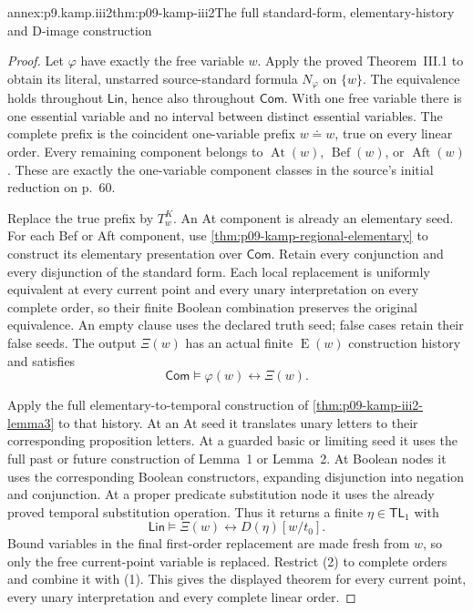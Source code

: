 \begin{annexitem}{annex:p9.kamp.iii2}{thm:p09-kamp-iii2}{The full standard-form, elementary-history and D-image construction}
\begin{proof}
Let \(\varphi\) have exactly the free variable \(w\).
Apply the proved Theorem~III.1 to obtain its literal, unstarred
source-standard formula \(N_\varphi\) on \(\{w\}\).
The equivalence holds throughout \(\mathsf{Lin}\), hence
also throughout \(\mathsf{Com}\). With one free variable
there is one essential variable and no interval between distinct
essential variables. The complete prefix is the coincident
one-variable prefix \(w\doteq w\), true on every linear
order. Every remaining component belongs to
\(\operatorname{At}(w)\), \(\operatorname{Bef}(w)\),
or \(\operatorname{Aft}(w)\). These are exactly the
one-variable component classes in the source's initial reduction
on p.~60.

Replace the true prefix by \(T^K_w\). An At component is
already an elementary seed. For each Bef or Aft component, use
\cref{thm:p09-kamp-regional-elementary} to construct its elementary
presentation over \(\mathsf{Com}\). Retain every conjunction
and every disjunction of the standard form. Each local replacement
is uniformly equivalent at every current point and every unary
interpretation on every complete order, so their finite Boolean
combination preserves the original equivalence. An empty clause
uses the declared truth seed; false cases retain their false
seeds. The output \(\Xi(w)\) has an actual finite
\(\operatorname{E}(w)\) construction history and satisfies
\[
                         \mathsf{Com}\models\varphi(w)\longleftrightarrow\Xi(w).
 \tag{1}
\]

Apply the full elementary-to-temporal construction of
\cref{thm:p09-kamp-iii2-lemma3} to that history. At an At
seed it translates unary letters to their corresponding proposition
letters. At a guarded basic or limiting seed it uses the full
past or future construction of Lemma~1 or Lemma~2. At Boolean
nodes it uses the corresponding Boolean constructors, expanding
disjunction into negation and conjunction. At a proper predicate
substitution node it uses the already proved temporal substitution
operation. Thus it returns a finite \(\eta\in\mathsf{TL}_1\)
with
\[
                         \mathsf{Lin}\models\Xi(w)\longleftrightarrow D(\eta)[w/t_0].
 \tag{2}
\]
Bound variables in the final first-order replacement are made fresh
from \(w\), so only the free current-point variable is replaced.
Restrict (2) to complete orders and combine it with (1). This gives
the displayed theorem for every current point, every unary
interpretation and every complete linear order.


\end{proof}
\end{annexitem}
